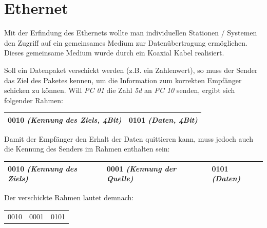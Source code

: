 \documentclass[12pt,a4paper]{article}
\begin{document}
\section{Ethernet}
Mit der Erfindung des Ethernets wollte man individuellen Stationen / Systemen den Zugriff auf ein gemeinsames Medium zur Datenübertragung ermöglichen. Dieses gemeinsame Medium wurde durch ein Koaxial Kabel realisiert.
\begin{figure}[h]
\centering
{}
\end{figure}\newline
Soll ein Datenpaket verschickt werden (z.B. ein Zahlenwert), so muss der Sender das Ziel des Paketes kennen, um die Information zum korrekten Empfänger schicken zu können. \newline
Will \textit{PC 01} die Zahl \textit{5d} an \textit{PC 10} senden, ergibt sich folgender Rahmen:
\begin{center}
\begin{tabularx}{14cm}{|X|X|}
\hline
0010 \textit{(Kennung des Ziels, 4Bit)}&0101 \textit{(Daten, 4Bit)}\\
\hline
\end{tabularx}
\end{center}
Damit der Empfänger den Erhalt der Daten quittieren kann, muss jedoch auch die Kennung des Senders im Rahmen enthalten sein:
\begin{center}
\begin{tabularx}{17cm}{|X|X|X|}
\hline
0010 \textit{(Kennung des Ziels)}&0001 \textit{(Kennung der Quelle)}&0101 \textit{(Daten)}\\
\hline
\end{tabularx}
\end{center}
Der verschickte Rahmen lautet demnach:
\begin{center}
\begin{tabularx}{5cm}{XXX}
0010&0001&0101\\
\end{tabularx}
\end{center}
\end{document}
